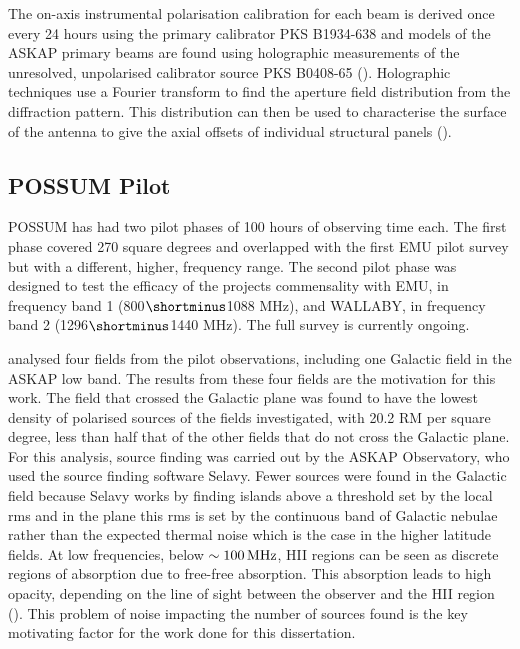 The on-axis instrumental polarisation calibration for each beam is derived once every 24 hours using the primary calibrator PKS B1934-638 and models of the ASKAP primary beams are found using holographic measurements of the unresolved, unpolarised calibrator source PKS B0408-65 (\cite{POSSUM}). Holographic techniques use a Fourier transform to find the aperture field distribution from the diffraction pattern. This distribution can then be used to characterise the surface of the antenna to give the axial offsets of individual structural panels (\cite{hotan2016holographic}).

\subsection{POSSUM Pilot}

POSSUM has had two pilot phases of 100 hours of observing time each. The first phase covered 270 square degrees and overlapped with the first EMU pilot survey but with a different, higher, frequency range. The second pilot phase was designed to test the efficacy of the projects commensality with EMU, in frequency band 1 (800$\shortminus$1088 MHz), and WALLABY, in frequency band 2 (1296$\shortminus$1440 MHz). The full survey is currently ongoing. 

\cite{vanderwoude2024prototypefaradayrotationmeasure} analysed four fields from the pilot observations, including one Galactic field in the ASKAP low band. The results from these four fields are the motivation for this work. The field that crossed the Galactic plane was found to have the lowest density of polarised sources of the fields investigated, with 20.2 RM per square degree, less than half that of the other fields that do not cross the Galactic plane. For this analysis, source finding was carried out by the ASKAP Observatory, who used the source finding software Selavy. Fewer sources were found in the Galactic field because Selavy works by finding islands above a threshold set by the local rms and in the plane this rms is set by the continuous band of Galactic nebulae rather than the expected thermal noise which is the case in the higher latitude fields. At low frequencies, below $\sim 100\,{\rm MHz}$, HII regions can be seen as discrete regions of absorption due to free-free absorption. This absorption leads to high opacity, depending on the line of sight between the observer and the HII region (\cite{free_free}). This problem of noise impacting the number of sources found is the key motivating factor for the work done for this dissertation.



